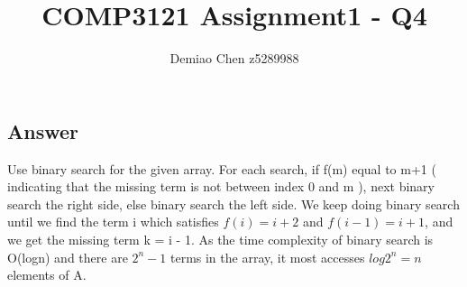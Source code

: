 \documentclass[12pt]{article}
\title{COMP3121 Assignment1 - Q4}
\author{Demiao Chen z5289988}
\begin{document}
\maketitle
{}

\subsection*{Answer}
Use binary search for the given array. For each search, if f(m) equal to m+1 (
    indicating that the missing term is not between index 0 and m
), next binary search the right side, else binary search the left side. We keep doing 
binary search until we find the term i which satisfies $f(i) = i+2$ and $f(i-1) = i+1$, 
and we get the missing term k = i - 1.
As the time complexity of binary search is O(logn) and there are $2^n-1$ terms in the 
array, it most accesses $log2^n = n$ elements of A.
\end{document}
